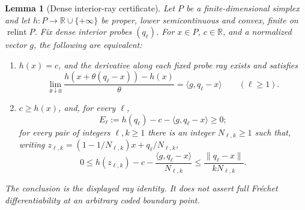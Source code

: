 \documentclass[11pt,a4paper]{article}
\newtheorem{lemma}[theorem]{Lemma}
\newcommand{\R}{\mathbb R}
\newcommand{\ri}{\operatorname{relint}}
\begin{document}
\begin{lemma}[Dense interior-ray certificate]\label{rays}
Let \(P\) be a finite-dimensional simplex and let
\(h:P\to\R\cup\{+\infty\}\) be proper, lower semicontinuous and convex,
finite on \(\ri P\). Fix dense interior probes \((q_\ell)\).
For \(x\in P\), \(c\in\R\), and a normalized vector \(g\),
the following are equivalent:
\begin{enumerate}
\item \(h(x)=c\), and the derivative along each fixed probe ray exists and satisfies
\begin{equation}
\lim_{\theta\downarrow0}\frac{h(x+\theta(q_\ell-x))-h(x)}{\theta}
=\langle g,q_\ell-x\rangle\qquad(\ell\ge1).
\label{eq:d}
\end{equation}
\item \(c\ge h(x)\), and, for every \(\ell\),
\begin{equation}
E_\ell:=h(q_\ell)-c-\langle g,q_\ell-x\rangle\ge0;
\label{eq:g1}
\end{equation}
for every pair of integers \(\ell,k\ge1\) there is an integer
\(N_{\ell,k}\ge1\) such that, writing
\(z_{\ell,k}=(1-1/N_{\ell,k})x+q_\ell/N_{\ell,k}\),
\begin{equation}
0\le h(z_{\ell,k})-c-
\frac{\langle g,q_\ell-x\rangle}{N_{\ell,k}}
\le\frac{\|q_\ell-x\|}{kN_{\ell,k}}.
\label{eq:g2}
\end{equation}
\end{enumerate}
The conclusion is the displayed ray identity. It does not assert full
Fr\'echet differentiability at an arbitrary coded boundary point.
\end{lemma}
\end{document}

